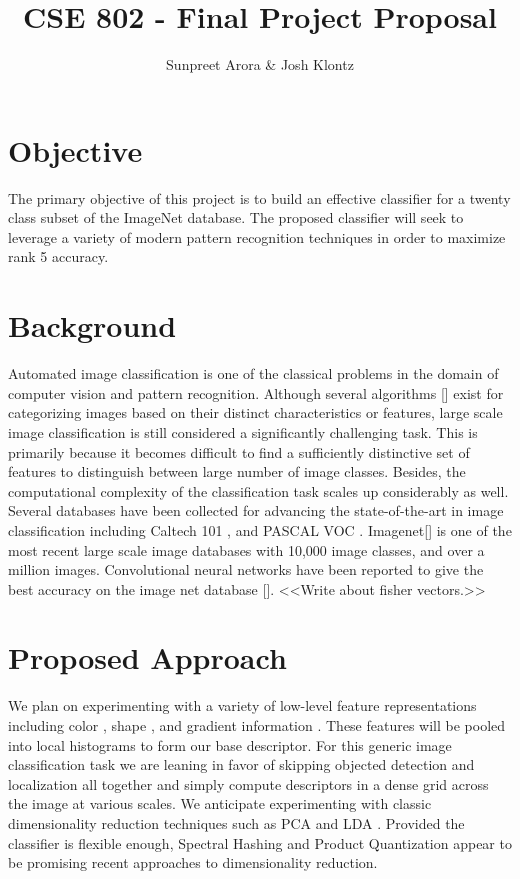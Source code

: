 \documentclass[12pt]{article}
\begin{document}
 
\title{CSE 802 - Final Project Proposal}
\author{Sunpreet Arora \& Josh Klontz\\
}
 
\maketitle

\section{Objective}
The primary objective of this project is to build an effective classifier for a twenty class subset of the ImageNet \cite{imagenet} database. 
The proposed classifier will seek to leverage a variety of modern pattern recognition techniques in order to maximize rank 5 accuracy.

\section{Background}
Automated image classification is one of the classical problems in the domain of computer vision and pattern recognition. Although several algorithms [] exist for categorizing images based on their distinct characteristics or features, large scale image classification is still considered a significantly challenging task. This is primarily because it becomes difficult to find a sufficiently distinctive set of features to distinguish between large number of image classes. Besides, the computational complexity of the classification task scales up considerably as well.\\
Several databases have been collected for advancing the state-of-the-art in image classification including Caltech 101 \cite{caltech101}, and PASCAL VOC \cite{pascal09}. Imagenet[] is one of the most recent large scale image databases with 10,000 image classes, and over a million images. Convolutional neural networks have been reported to give the best accuracy on the image net database []. <<Write about fisher vectors.>>


\section{Proposed Approach}
We plan on experimenting with a variety of low-level feature representations including color \cite{sande10}, shape \cite{ahonen06}, and gradient information \cite{lowe04,dalal05}.
These features will be pooled into local histograms to form our base descriptor.
For this generic image classification task we are leaning in favor of skipping objected detection and localization all together and simply compute descriptors in a dense grid across the image at various scales.
We anticipate experimenting with classic dimensionality reduction techniques such as PCA \cite{turk91} and LDA \cite{belhumeur97}.
Provided the classifier is flexible enough, Spectral Hashing \cite{weiss2008} and Product Quantization \cite{jegou2011} appear to be promising recent approaches to dimensionality reduction.



\end{document}

